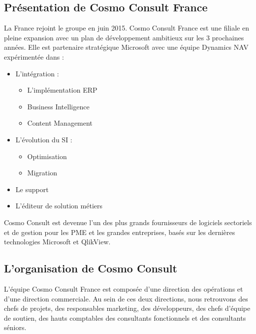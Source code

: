 \documentclass[11pt]{report}
\begin{document}
	\subsection{Présentation de Cosmo Consult France}
\hspace{1cm} La France rejoint le groupe en juin 2015. Cosmo Consult France est une filiale en pleine expansion avec un plan de développement ambitieux sur les 3 prochaines années. Elle est partenaire stratégique Microsoft avec une équipe Dynamics NAV expérimentée dans :
\begin{itemize}
	\item L’intégration :
		\begin{itemize}
			\item L’implémentation ERP
			\item Business Intelligence
			\item Content Management
		\end{itemize}
		
	\item L’évolution du SI :
		\begin{itemize}
			\item Optimisation
			\item Migration
		\end{itemize}	 
	\item Le support  
	\item L'éditeur de solution métiers
\end{itemize}

\hspace{1cm} Cosmo Consult est devenue l'un des plus grands fournisseurs de logiciels sectoriels et de gestion pour les PME et les grandes entreprises, basés sur les dernières technologies Microsoft et QlikView.\\

	\subsection{L'organisation de Cosmo Consult}
\hspace{1cm}L'équipe Cosmo Consult France est composée d'une direction des opérations et d'une direction commerciale. Au sein de ces deux directions, nous retrouvons des chefs de projets, des responsables marketing, des développeurs, des chefs d'équipe de soutien, des hauts comptables des consultants fonctionnels et des consultants séniors.\\
\end{document}
